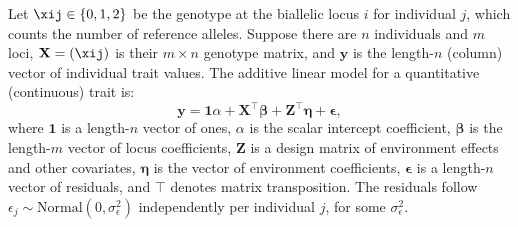 \documentclass[11pt]{article}
\begin{document}
\begin{linenumbers}
Let $\xij \in \{ 0, 1, 2 \}$ be the genotype at the biallelic locus $i$ for individual $j$, which counts the number of reference alleles.
Suppose there are $n$ individuals and $m$ loci,
$\mathbf{X} = ( \xij )$ is their $m \times n$ genotype matrix, and
$\mathbf{y}$ is the length-$n$ (column) vector of individual trait values.
The additive linear model for a quantitative (continuous) trait is:
\begin{equation}
  \label{eq:trait}
  \mathbf{y}
  =
  \mathbf{1} \alpha + \mathbf{X}^\intercal \boldsymbol{\beta} + \mathbf{Z}^\intercal \boldsymbol{\eta} + \boldsymbol{\epsilon}
  ,
\end{equation}
where
$\mathbf{1}$ is a length-$n$ vector of ones,
$\alpha$ is the scalar intercept coefficient,
$\boldsymbol{\beta}$ is the length-$m$ vector of locus coefficients,
$\mathbf{Z}$ is a design matrix of environment effects and other covariates,
$\boldsymbol{\eta}$ is the vector of environment coefficients,
$\boldsymbol{\epsilon}$ is a length-$n$ vector of residuals,
and $\intercal$ denotes matrix transposition.
The residuals follow $\epsilon_j \sim \text{Normal}(0, \sigma^2_\epsilon)$ independently per individual $j$, for some $\sigma^2_\epsilon$.


\end{linenumbers}
\end{document}
